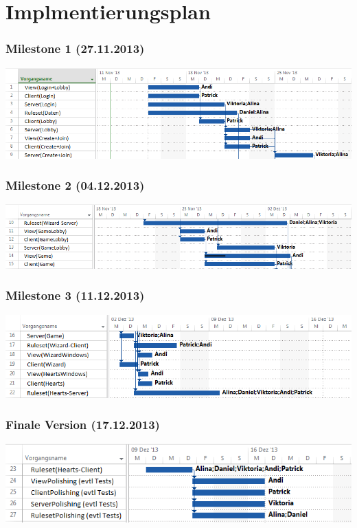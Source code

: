\documentclass{beamer}
\begin{document}
\section{Implmentierungsplan}

\begin{frame}
\frametitle{Milestone 1 (27.11.2013)}
\includegraphics[scale=0.48]{Milestone1}
\end{frame}

\begin{frame}
\frametitle{Milestone 2 (04.12.2013)}
\includegraphics[scale=0.48]{Milestone2}
\end{frame}

\begin{frame}
\frametitle{Milestone 3 (11.12.2013)}
\includegraphics[scale=0.48]{Milestone3}
\end{frame}

\begin{frame}
\frametitle{Finale Version (17.12.2013)}
\includegraphics[scale=0.48]{Milestone4}
\end{frame}

	
\end{document}
